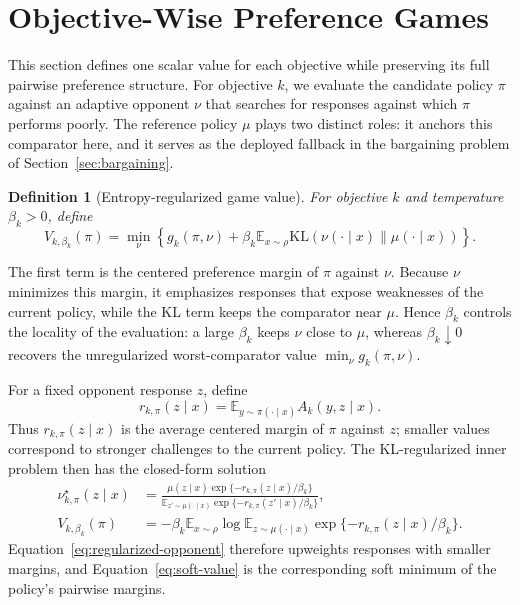 \documentclass{article}
\newtheorem{definition}{Definition}
\theoremstyle{remark}
\theoremstyle{plain}
\newcommand{\KL}{\mathrm{KL}}
\newcommand{\E}{\mathbb{E}}
\begin{document}
\section{Objective-Wise Preference Games}
\label{sec:game-utility}
This section defines one scalar value for each objective while preserving its full pairwise preference structure. For objective $k$, we evaluate the candidate policy $\pi$ against an adaptive opponent $\nu$ that searches for responses against which $\pi$ performs poorly. The reference policy $\mu$ plays two distinct roles: it anchors this comparator here, and it serves as the deployed fallback in the bargaining problem of Section~\ref{sec:bargaining}.

\begin{definition}[Entropy-regularized game value]
\label{def:game-value}
For objective $k$ and temperature $\beta_k>0$, define
\begin{equation}
V_{k,\beta_k}(\pi)
=
\min_{\nu} \left\{g_k(\pi,\nu)
+
\beta_k
\E_{x\sim\rho}
\KL\left(
\nu(\cdot\mid x)\|\mu(\cdot\mid x)
\right)\right\}.
\label{eq:game-value}
\end{equation}
\end{definition}
The first term is the centered preference margin of $\pi$ against $\nu$. Because $\nu$ minimizes this margin, it emphasizes responses that expose weaknesses of the current policy, while the KL term keeps the comparator near $\mu$. Hence $\beta_k$ controls the locality of the evaluation: a large $\beta_k$ keeps $\nu$ close to $\mu$, whereas $\beta_k\downarrow0$ recovers the unregularized worst-comparator value $\min_\nu g_k(\pi,\nu)$.

For a fixed opponent response $z$, define
\begin{equation}
r_{k,\pi}(z\mid x)=\E_{y\sim\pi(\cdot\mid x)}A_k(y,z\mid x).
\label{eq:r-def}
\end{equation}
Thus $r_{k,\pi}(z\mid x)$ is the average centered margin of $\pi$ against $z$; smaller values correspond to stronger challenges to the current policy. The KL-regularized inner problem then has the closed-form solution
\begin{align}
\nu^\star_{k,\pi}(z\mid x)
&=
\frac{\mu(z\mid x)\exp\{-r_{k,\pi}(z\mid x)/\beta_k\}}
{\E_{z'\sim\mu(\cdot\mid x)}\exp\{-r_{k,\pi}(z'\mid x)/\beta_k\}},
\label{eq:regularized-opponent}\\
V_{k,\beta_k}(\pi)
&=-\beta_k\E_{x\sim\rho}
\log\E_{z\sim\mu(\cdot\mid x)}
\exp\{-r_{k,\pi}(z\mid x)/\beta_k\}.
\label{eq:soft-value}
\end{align}
Equation~\eqref{eq:regularized-opponent} therefore upweights responses with smaller margins, and Equation~\eqref{eq:soft-value} is the corresponding soft minimum of the policy's pairwise margins.
\end{document}
